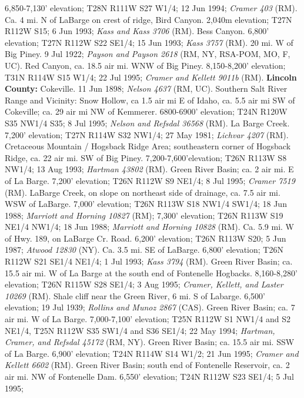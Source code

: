 6,850-7,130’ elevation; T28N R111W S27 W1/4; 12 Jun 1994;
\textit{Cramer 403} (RM).
Ca. 4 mi. N of LaBarge on crest of ridge, Bird Canyon. 2,040m elevation;
T27N R112W S15; 6 Jun 1993; \textit{Kass and Kass 3706} (RM).
Bess Canyon. 6,800’ elevation; T27N R112W S22 SE1/4; 15 Jun 1993;
\textit{Kass 3757} (RM).
20 mi. W of Big Piney. 9 Jul 1922;
\textit{Payson and Payson 2618} (RM, NY, RSA-POM, MO, F, UC).
Red Canyon, ca. 18.5 air mi. WNW of Big Piney. 8,150-8,200’ elevation;
T31N R114W S15 W1/4; 22 Jul 1995; \textit{Cramer and Kellett 9011b} (RM).
  \textbf{Lincoln County:}
Cokeville. 11 Jun 1898; \textit{Nelson 4637} (RM, UC).
Southern Salt River Range and Vicinity: Snow Hollow, ca 1.5 air mi E of Idaho,
ca. 5.5 air mi SW of Cokeville; ca. 29 air mi NW of Kemmerer.
6800-6900' elevation; T24N R120W S35 NW1/4 S35; 8 Jul 1995;
\textit{Nelson and Refsdal 36568} (RM).
La Barge Creek. 7,200' elevation; T27N R114W S32	NW1/4; 27 May 1981;
\textit{Lichvar 4207} (RM).
Cretaceous Mountain / Hogsback Ridge Area; southeastern corner of Hogsback
Ridge, ca. 22 air mi. SW of Big Piney. 7,200-7,600'elevation; T26N R113W S8
NW1/4; 13 Aug 1993; \textit{Hartman 43802} (RM).
Green River Basin; ca. 2 air mi. E of La Barge. 7,200' elevation;
T26N R112W S9 NE1/4; 8 Jul 1995; \textit{Cramer 7519} (RM).
LaBarge Creek, on slope on northeast side of drainage, ca. 7.5 air mi.
WSW of LaBarge. 7,000’ elevation; T26N R113W S18 NW1/4 SW1/4; 18 Jun 1988;
\textit{Marriott and Horning 10827} (RM);
7,300’ elevation; T26N R113W S19 NE1/4 NW1/4; 18 Jun 1988;
\textit{Marriott and Horning 10828} (RM).
Ca. 5.9 mi. W of Hwy. 189, on LaBarge Cr. Road. 6,200' elevation;
T26N R113W S20; 5 Jun 1987; \textit{Atwood 12830} (NY).
Ca. 3.5 mi. SE of LaBarge. 6,800' elevation; T26N R112W S21 SE1/4 NE1/4;
1 Jul 1993; \textit{Kass 3794} (RM).
Green River Basin; ca. 15.5 air mi. W of La Barge at the south end of
Fontenelle Hogbacks. 8,160-8,280' elevation; T26N R115W S28	SE1/4; 3 Aug 1995;
\textit{Cramer, Kellett, and Laster 10269} (RM).
Shale cliff near the Green River, 6 mi. S of Labarge. 6,500' elevation;
19 Jul 1939; \textit{Rollins and Munoz 2867} (CAS).
Green River Basin; ca. 7 air mi. W of La Barge. 7,000-7,100' elevation;
T25N R112W S1 NW1/4 and S2 NE1/4, T25N R112W S35 SW1/4 and S36 SE1/4;
22 May 1994; \textit{Hartman, Cramer, and Refsdal 45172} (RM, NY).
Green River Basin; ca. 15.5 air mi. SSW of La Barge. 6,900' elevation;
T24N R114W S14 W1/2; 21 Jun 1995; \textit{Cramer and Kellett 6602} (RM).
Green River Basin; south end of Fontenelle Reservoir, ca. 2 air mi. NW of
Fontenelle Dam. 6,550' elevation; T24N R112W S23 SE1/4; 5 Jul 1995;
